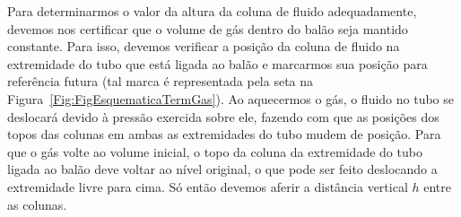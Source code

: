 Para determinarmos o valor da altura da coluna de fluido adequadamente, devemos nos certificar que o volume de gás dentro do balão seja mantido constante. Para isso, devemos verificar a posição da coluna de fluido na extremidade do tubo que está ligada ao balão e marcarmos sua posição para referência futura (tal marca é representada pela seta na Figura~\ref{Fig:FigEsquematicaTermGas}). Ao aquecermos o gás, o fluido no tubo se deslocará devido à pressão exercida sobre ele, fazendo com que as posições dos topos das colunas em ambas as extremidades do tubo  mudem de posição. Para que o gás volte ao volume inicial, o topo da coluna da extremidade do tubo ligada ao balão deve voltar ao nível original, o que pode ser feito deslocando a extremidade livre para cima. Só então devemos aferir a distância vertical $h$ entre as colunas.


